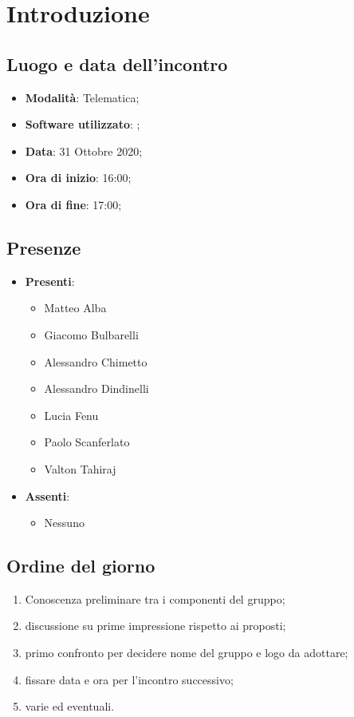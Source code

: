 \documentclass[]{article}
\begin{document}
	

	\newpage


	\section{Introduzione}
		\subsection{Luogo e data dell'incontro}
		\begin{itemize}
			\item \textbf{Modalità}: Telematica;
			\item \textbf{Software utilizzato}: ;
			\item \textbf{Data}: 31 Ottobre 2020;
			\item \textbf{Ora di inizio}: 16:00;
			\item \textbf{Ora di fine}: 17:00;
		\end{itemize}

		\subsection{Presenze}
		\begin{itemize}
			\item \textbf{Presenti}:
			\begin{itemize}
				\item Matteo Alba
				\item Giacomo Bulbarelli
				\item Alessandro Chimetto
				\item Alessandro Dindinelli
				\item Lucia Fenu
				\item Paolo Scanferlato
				\item Valton Tahiraj
			\end{itemize}
			\item \textbf{Assenti}:
			\begin{itemize}
				\item Nessuno
			\end{itemize}
		\end{itemize}


		\subsection{Ordine del giorno}
		\begin{enumerate}
			\item Conoscenza preliminare tra i componenti del gruppo;
			\item discussione su prime impressione rispetto ai  proposti;
			\item primo confronto per decidere nome del gruppo e logo da adottare;
			\item fissare data e ora per l'incontro successivo;
			\item varie ed eventuali.
		\end{enumerate}
\end{document}
